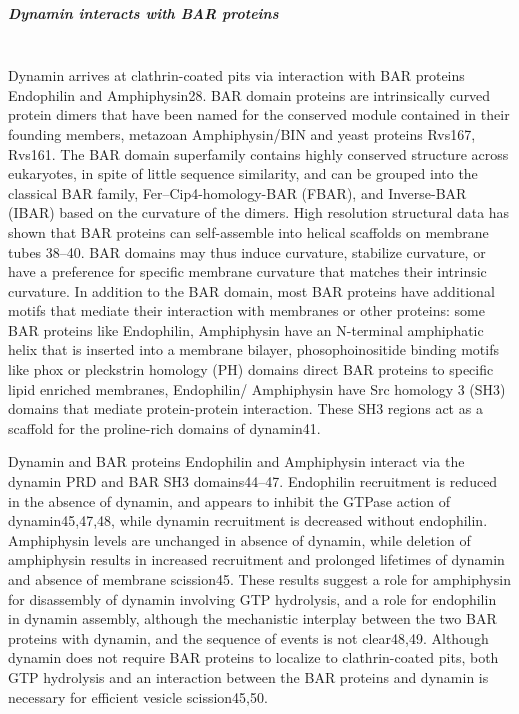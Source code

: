 	\subparagraph{Dynamin interacts with BAR proteins}
\mbox{} \\
Dynamin arrives at clathrin-coated pits via interaction with BAR proteins Endophilin and Amphiphysin28. BAR domain proteins are intrinsically curved protein dimers that have been named for the conserved module contained in their founding members, metazoan Amphiphysin/BIN and yeast proteins Rvs167, Rvs161. The BAR domain superfamily contains highly conserved structure across eukaryotes, in spite of little sequence similarity, and can be grouped into the classical BAR family, Fer–Cip4-homology-BAR (FBAR), and Inverse-BAR (IBAR) based on the curvature of the dimers. High resolution structural data has shown that BAR proteins can self-assemble into helical scaffolds on membrane tubes 38–40. BAR domains may thus induce curvature, stabilize curvature, or have a preference for specific membrane curvature that matches their intrinsic curvature. In addition to the BAR domain, most BAR proteins have additional motifs that mediate their interaction with membranes or other proteins: some BAR proteins like Endophilin, Amphiphysin have an N-terminal amphiphatic helix that is inserted into a membrane bilayer, phosophoinositide binding motifs like phox or pleckstrin homology (PH) domains direct BAR proteins to specific lipid enriched membranes, Endophilin/ Amphiphysin have Src homology 3 (SH3) domains that mediate protein-protein interaction. These SH3 regions act as a scaffold for the proline-rich domains of dynamin41. 

\vspace{5mm}
Dynamin and BAR proteins Endophilin and Amphiphysin interact via the dynamin PRD and BAR SH3 domains44–47. Endophilin recruitment is reduced in the absence of dynamin, and appears to inhibit the GTPase action of dynamin45,47,48, while dynamin recruitment is decreased without endophilin. Amphiphysin levels are unchanged in absence of dynamin, while deletion of amphiphysin results in increased recruitment and prolonged lifetimes of dynamin and absence of membrane scission45. These results suggest a role for amphiphysin for disassembly of dynamin involving GTP hydrolysis, and a role for endophilin in dynamin assembly, although the mechanistic interplay between the two BAR proteins with dynamin, and the sequence of events is not clear48,49. Although dynamin does not require BAR proteins to localize to clathrin-coated pits, both GTP hydrolysis and an interaction between the BAR proteins and dynamin is necessary for efficient vesicle scission45,50.





